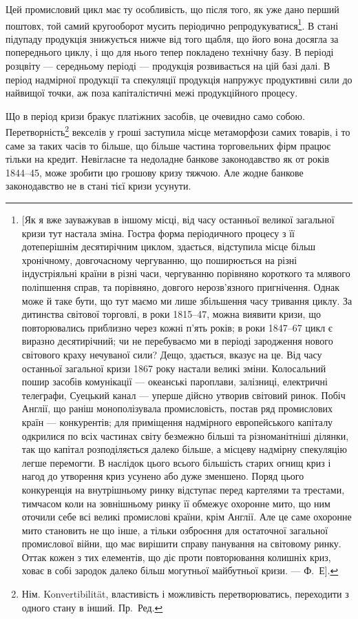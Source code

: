 Цей промисловий цикл має ту особливість, що після того, як уже дано перший
поштовх, той самий кругооборот мусить періодично репродукуватися\footnote{
[Як я вже зауважував в іншому місці, від часу останньої великої загальної кризи тут настала
зміна. Гостра форма періодичного процесу з її дотеперішнім десятирічним циклом, здається, відступила
місце більш хронічному, довгочасному чергуванню, що поширюється на різні індустріяльні країни в
різні
часи, чергуванню порівняно короткого та млявого поліпшення справ, та порівняно, довгого
нерозв'язного
пригнічення. Однак може й таке бути, що тут маємо ми лише збільшення часу тривання циклу. За
дитинства
світової торговлі, в роки 1815--47, можна виявити кризи, що повторювались приблизно через
кожні п’ять років; в роки 1847--67 цикл є виразно десятирічний; чи не перебуваємо ми в періоді
зародження нового світового краху нечуваної сили? Дещо, здається, вказує на це. Від часу останньої
загальної кризи 1867 року настали великі зміни. Колосальний пошир засобів комунікації — океанські
пароплави,
залізниці, електричні телеграфи, Суецький канал — уперше дійсно утворив світовий ринок. Побіч
Англії, що раніш монополізувала промисловість, постав ряд промислових країн — конкурентів; для
приміщення надмірного европейського капіталу одкрилися по всіх частинах світу безмежно більші та
різноманітніші ділянки, так що капітал розподіляється далеко більше, а місцеву надмірну спекуляцію
легше перемогти. В наслідок цього всього більшість старих огнищ криз і нагод до утворення криз
усунено
або дуже зменшено. Поряд цього конкуренція на внутрішньому ринку відступає перед картелями та
трестами, тимчасом коли на зовнішньому ринку її обмежує охоронне мито, що ним оточили себе всі
великі
промислові країни, крім Англії. Але це саме охоронне мито становить не що інше, а тільки озброєння
для остаточної загальної промислової війни, що має вирішити справу панування на світовому ринку.
Оттак кожен з тих елементів, що діє проти повторювання колишніх криз, ховає в собі зародок далеко
більш могутньої майбутньої кризи. — Ф.~Е].
}. В стані
підупаду продукція знижується нижче від того щабля, що його вона досягла
за попереднього циклу, і що для нього тепер покладено технічну базу. В періоді
розцвіту — середньому періоді — продукція розвивається на цій базі далі. В період
надмірної продукції та спекуляції продукція напружує продуктивні сили до найвищої
точки, аж поза капіталістичні межі продукційного процесу.

Що в період кризи бракує платіжних засобів, це очевидно само собою.
Перетворність\footnote*{
Нім. Konvertibilität, властивість і можливість перетворюватись, переходити
з одного стану в інший. Пр.~Ред.
} векселів у гроші заступила місце метаморфози самих товарів,
і то саме за таких часів то більше, що більше частина торговельних фірм працює
тільки на кредит. Невігласне та недоладне банкове законодавство як от
років 1844--45, може зробити цю грошову кризу тяжчою. Але жодне банкове
законодавство не в стані тієї кризи усунути.

